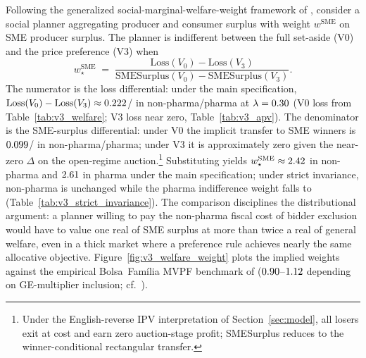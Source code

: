 Following the generalized social-marginal-welfare-weight framework of \citet{saezstantcheva2016}, consider a social planner aggregating producer and consumer surplus with weight $w^{\text{SME}}$ on SME producer surplus. The planner is indifferent between the full set-aside (V0) and the \optPrefThreshold{} price preference (V3) when
\begin{equation}\label{eq:welfare_weight}
w^{\text{SME}}_\star
\;=\; \frac{\mathrm{Loss}(V_0) - \mathrm{Loss}(V_3)}
           {\mathrm{SMESurplus}(V_0) - \mathrm{SMESurplus}(V_3)}.
\end{equation}
The numerator is the loss differential: under the main specification, $\mathrm{Loss}(V_0) - \mathrm{Loss}(V_3) \approx 0.222$/\welfTotalLossLthirtyPh{} in non-pharma/pharma at $\lambda = 0.30$ (V0 loss from Table~\ref{tab:v3_welfare}; V3 loss near zero, Table~\ref{tab:v3_apv}). The denominator is the SME-surplus differential: under V0 the implicit transfer to SME winners is $0.099$/\welfTransferPh{} in non-pharma/pharma; under V3 it is approximately zero given the near-zero $\Delta$ on the open-regime auction.\footnote{Under the English-reverse IPV interpretation of Section~\ref{sec:model}, all losers exit at cost and earn zero auction-stage profit; SMESurplus reduces to the winner-conditional rectangular transfer.} Substituting yields $w^{\text{SME}}_\star \approx 2.42$ in non-pharma and $2.61$ in pharma under the main specification; under strict invariance, non-pharma is unchanged while the pharma indifference weight falls to \welfWeightSiPh{} (Table~\ref{tab:v3_strict_invariance}). The comparison disciplines the distributional argument: a planner willing to pay the non-pharma fiscal cost of bidder exclusion would have to value one real of SME surplus at more than twice a real of general welfare, even in a thick market where a preference rule achieves nearly the same allocative objective. Figure~\ref{fig:v3_welfare_weight} plots the implied weights against the empirical Bolsa~Fam\'ilia MVPF benchmark of \citet{bergstrom2025} ($0.90$--$1.12$ depending on GE-multiplier inclusion; cf.\ \citet{mendes2024}).

